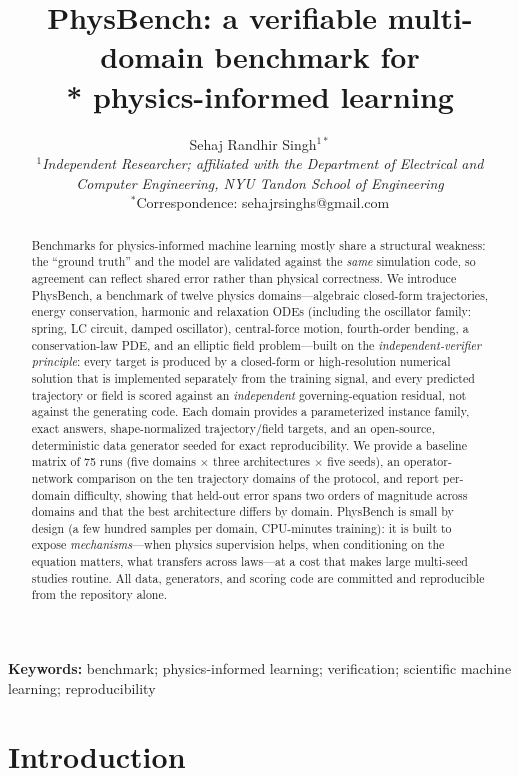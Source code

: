\documentclass[11pt,a4paper]{article}
\title{\Large\bfseries PhysBench: a verifiable multi-domain benchmark for\\*
physics-informed learning}
\author{
  Sehaj Randhir Singh$^{1*}$ \\
  \small\textit{$^{1}$Independent Researcher; affiliated with the Department of
  Electrical and Computer Engineering, NYU Tandon School of Engineering}\\
  \small$^{*}$Correspondence: sehajrsinghs@gmail.com
}
\date{}
\begin{document}
\maketitle
\vspace{-1.2em}

\begin{abstract}
\noindent Benchmarks for physics-informed machine learning mostly share a
structural weakness: the ``ground truth'' and the model are validated against
the \emph{same} simulation code, so agreement can reflect shared error rather
than physical correctness. We introduce PhysBench, a benchmark of twelve
physics domains---algebraic closed-form trajectories, energy conservation,
harmonic and relaxation ODEs (including the oscillator family: spring, LC
circuit, damped oscillator), central-force motion, fourth-order bending, a
conservation-law PDE, and an elliptic field problem---built on the
\emph{independent-verifier principle}: every target is produced by a
closed-form or high-resolution numerical solution that is implemented
separately from the training signal, and every predicted trajectory or field
is scored against an \emph{independent} governing-equation residual, not
against the generating code. Each domain provides a parameterized instance
family, exact answers, shape-normalized trajectory/field targets, and an
open-source, deterministic data generator seeded for exact reproducibility.
We provide a baseline matrix of 75 runs (five domains $\times$ three
architectures $\times$ five seeds), an operator-network comparison on the
ten trajectory domains of the protocol, and report per-domain difficulty,
showing that
held-out error spans two orders of magnitude across domains and that the
best architecture differs by domain.
PhysBench is small by design (a few hundred samples per domain, CPU-minutes
training): it is built to expose \emph{mechanisms}---when physics supervision
helps, when conditioning on the equation matters, what transfers across
laws---at a cost that makes large multi-seed studies routine. All data,
generators, and scoring code are committed and reproducible from the
repository alone.
\end{abstract}

\noindent\textbf{Keywords:} benchmark; physics-informed learning;
verification; scientific machine learning; reproducibility

\section{Introduction}
\label{sec:intro}
\end{document}
